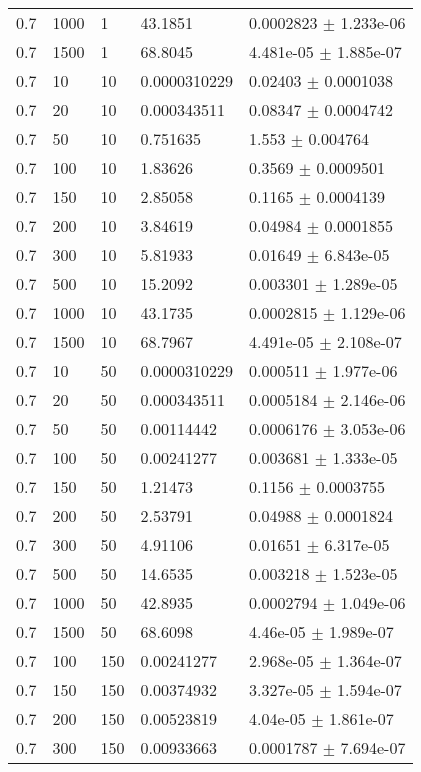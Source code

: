 \begin{longtable}{lllll}
 0.7 &  1000 &     1 &  43.1851 & 0.0002823 $\pm$ 1.233e-06 \\
 0.7 &  1500 &     1 &  68.8045 & 4.481e-05 $\pm$ 1.885e-07 \\
 0.7 &    10 &    10 & 0.0000310229 &  0.02403 $\pm$ 0.0001038 \\
 0.7 &    20 &    10 & 0.000343511 &  0.08347 $\pm$ 0.0004742 \\
 0.7 &    50 &    10 & 0.751635 &    1.553 $\pm$ 0.004764 \\
 0.7 &   100 &    10 &  1.83626 &   0.3569 $\pm$ 0.0009501 \\
 0.7 &   150 &    10 &  2.85058 &   0.1165 $\pm$ 0.0004139 \\
 0.7 &   200 &    10 &  3.84619 &  0.04984 $\pm$ 0.0001855 \\
 0.7 &   300 &    10 &  5.81933 &  0.01649 $\pm$ 6.843e-05 \\
 0.7 &   500 &    10 &  15.2092 & 0.003301 $\pm$ 1.289e-05 \\
 0.7 &  1000 &    10 &  43.1735 & 0.0002815 $\pm$ 1.129e-06 \\
 0.7 &  1500 &    10 &  68.7967 & 4.491e-05 $\pm$ 2.108e-07 \\
 0.7 &    10 &    50 & 0.0000310229 & 0.000511 $\pm$ 1.977e-06 \\
 0.7 &    20 &    50 & 0.000343511 & 0.0005184 $\pm$ 2.146e-06 \\
 0.7 &    50 &    50 & 0.00114442 & 0.0006176 $\pm$ 3.053e-06 \\
 0.7 &   100 &    50 & 0.00241277 & 0.003681 $\pm$ 1.333e-05 \\
 0.7 &   150 &    50 &  1.21473 &   0.1156 $\pm$ 0.0003755 \\
 0.7 &   200 &    50 &  2.53791 &  0.04988 $\pm$ 0.0001824 \\
 0.7 &   300 &    50 &  4.91106 &  0.01651 $\pm$ 6.317e-05 \\
 0.7 &   500 &    50 &  14.6535 & 0.003218 $\pm$ 1.523e-05 \\
 0.7 &  1000 &    50 &  42.8935 & 0.0002794 $\pm$ 1.049e-06 \\
 0.7 &  1500 &    50 &  68.6098 & 4.46e-05 $\pm$ 1.989e-07 \\
 0.7 &   100 &   150 & 0.00241277 & 2.968e-05 $\pm$ 1.364e-07 \\
 0.7 &   150 &   150 & 0.00374932 & 3.327e-05 $\pm$ 1.594e-07 \\
 0.7 &   200 &   150 & 0.00523819 & 4.04e-05 $\pm$ 1.861e-07 \\
 0.7 &   300 &   150 & 0.00933663 & 0.0001787 $\pm$ 7.694e-07 \\

\end{longtable}
